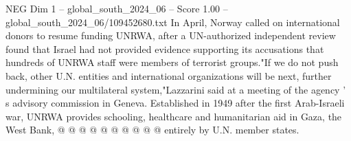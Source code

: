 \begin{textsample}{NEG Dim 1 – global\_south\_2024\_06 – Score 1.00 – global\_south\_2024\_06/109452680.txt}
In April, Norway called on international donors to resume funding UNRWA, after a UN-authorized independent review found that Israel had not provided evidence supporting its accusations that hundreds of UNRWA staff were members of terrorist groups."If we do not push back, other U.N. entities and international organizations will be next, further undermining our multilateral system,"Lazzarini said at a meeting of the agency ' s advisory commission in Geneva.
Established in 1949 after the first Arab-Israeli war, UNRWA provides schooling, healthcare and humanitarian aid in Gaza, the West Bank, @ @ @ @ @ @ @ @ @ @ entirely by U.N. member states.

\end{textsample}
